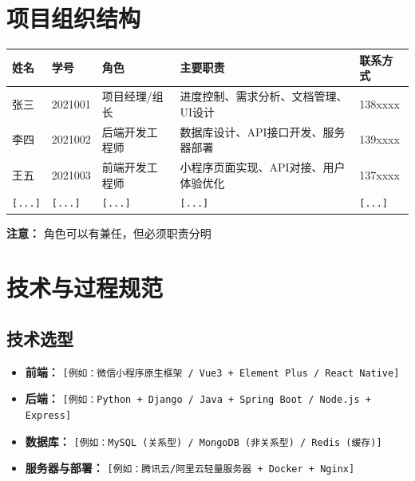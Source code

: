 \documentclass[12pt]{ctexart}
\begin{document}
\section{项目组织结构}
\begin{center}
\begin{tabular}{|p{2cm}|p{2cm}|p{2.5cm}|p{3.5cm}|p{2cm}|}
\hline
\textbf{姓名} & \textbf{学号} & \textbf{角色} & \textbf{主要职责} & \textbf{联系方式} \\
\hline
张三 & 2021001 & 项目经理/组长 & 进度控制、需求分析、文档管理、UI设计 & 138xxxx \\
\hline
李四 & 2021002 & 后端开发工程师 & 数据库设计、API接口开发、服务器部署 & 139xxxx \\
\hline
王五 & 2021003 & 前端开发工程师 & 小程序页面实现、API对接、用户体验优化 & 137xxxx \\
\hline
\texttt{[...]} & \texttt{[...]} & \texttt{[...]} & \texttt{[...]} & \texttt{[...]} \\
\hline
\end{tabular}
\end{center}

\begin{tcolorbox}
\textbf{注意：} 角色可以有兼任，但必须职责分明
\end{tcolorbox}

\section{技术与过程规范}

\subsection{技术选型}
\begin{itemize}
    \item \textbf{前端：} \texttt{[例如：微信小程序原生框架 / Vue3 + Element Plus / React Native]}
    \item \textbf{后端：} \texttt{[例如：Python + Django / Java + Spring Boot / Node.js + Express]}
    \item \textbf{数据库：} \texttt{[例如：MySQL (关系型) / MongoDB (非关系型) / Redis (缓存)]}
    \item \textbf{服务器与部署：} \texttt{[例如：腾讯云/阿里云轻量服务器 + Docker + Nginx]}
\end{itemize}
\end{document}
